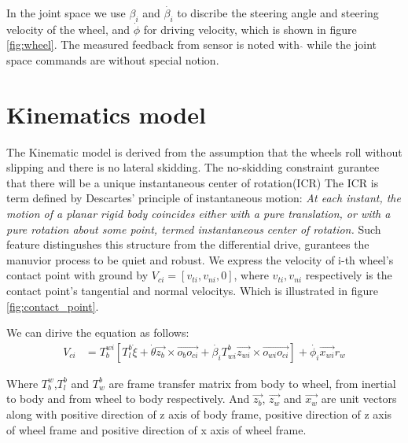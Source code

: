 In the joint space we use $\beta_{i}$ and $\dot{\beta_{i}}$ to discribe the steering angle and steering velocity of the wheel, and $\dot{\phi}$ for driving velocity, which is shown in figure \cref{fig:wheel}. The measured
feedback from sensor is noted with $\hat{}$ while the joint space commands are without special notion. 






\section{Kinematics model}
\label{sec:Kinematics}
The Kinematic model is derived from the assumption that the wheels roll without slipping and there is no lateral skidding. The no-skidding constraint gurantee that there will be a unique instantaneous center of rotation(ICR) 
The ICR is term defined by Descartes' principle of instantaneous motion: 
\textit{At each instant, the motion of a planar rigid body coincides either with a pure translation, or with a pure rotation about some point, termed 
instantaneous center of rotation.}
Such feature distingushes this structure from the differential drive, gurantees the manuvior process to be quiet and robust.
We express the velocity of i-th wheel's contact point with ground by $V_{ci}=[v_{ti},v_{ni},0]$, where $v_{ti},v_{ni}$ respectively is the contact point's  tangential and normal velocitys. Which is illustrated in 
figure \cref{fig:contact_point}.



We can dirive the equation as follows:
\begin{equation}\label{eq:contact_point_velocity}
	\begin{split}
	V_{ci} &= T_b^{wi} [T_l^b\dot{\xi} + \dot{\theta}\overrightarrow{z_b}\times\overrightarrow{o_bo_{ci}} + \dot{\beta_i}T_{wi}^b\overrightarrow{z_{wi}}\times\overrightarrow{o_{wi}o_{ci}}] + \dot{\phi_i}\overrightarrow{x_{wi}}r_w
	\end{split}
\end{equation}

Where $T_b^w$,$T_l^b$ and $T_w^b$ are frame transfer matrix from body to wheel, from inertial to body and from wheel to body respectively. And $\overrightarrow{z_b}$, $\overrightarrow{z_w}$ and 
$\overrightarrow{x_w}$ are unit vectors along with positive direction of z axis of body frame, positive direction of z axis of wheel frame and positive direction of x axis of wheel frame.

